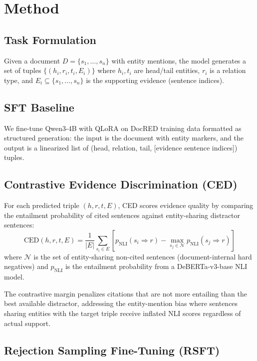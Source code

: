 \documentclass[11pt]{article}
\begin{document}
\section{Method}

\subsection{Task Formulation}

Given a document $D = \{s_1, \ldots, s_n\}$ with entity mentions, the model generates a set of tuples $\{(h_i, r_i, t_i, E_i)\}$ where $h_i, t_i$ are head/tail entities, $r_i$ is a relation type, and $E_i \subseteq \{s_1, \ldots, s_n\}$ is the supporting evidence (sentence indices).

\subsection{SFT Baseline}

We fine-tune Qwen3-4B with QLoRA on DocRED training data formatted as structured generation: the input is the document with entity markers, and the output is a linearized list of (head, relation, tail, [evidence sentence indices]) tuples.

\subsection{Contrastive Evidence Discrimination (CED)}

For each predicted triple $(h, r, t, E)$, CED scores evidence quality by comparing the entailment probability of cited sentences against entity-sharing distractor sentences:
\begin{equation}
\text{CED}(h,r,t,E) = \frac{1}{|E|} \sum_{s_i \in E} \left[ p_{\text{NLI}}(s_i \Rightarrow r) - \max_{s_j \in \mathcal{N}} p_{\text{NLI}}(s_j \Rightarrow r) \right]
\end{equation}
where $\mathcal{N}$ is the set of entity-sharing non-cited sentences (document-internal hard negatives) and $p_{\text{NLI}}$ is the entailment probability from a DeBERTa-v3-base NLI model.

The contrastive margin penalizes citations that are not more entailing than the best available distractor, addressing the entity-mention bias where sentences sharing entities with the target triple receive inflated NLI scores regardless of actual support.

\subsection{Rejection Sampling Fine-Tuning (RSFT)}
\end{document}
